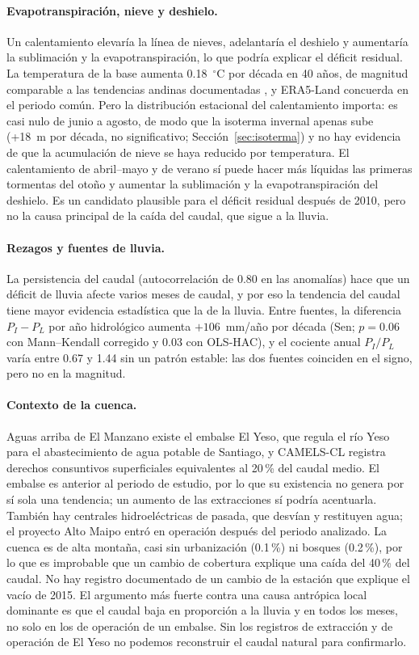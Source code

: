 \documentclass[11pt,a4paper]{article}
\newcommand{\PL}{P_L}
\newcommand{\PI}{P_I}
\begin{document}
\paragraph{Evapotranspiración, nieve y deshielo.} Un calentamiento elevaría la línea de nieves, adelantaría el deshielo y aumentaría la sublimación y la evapotranspiración, lo que podría explicar el déficit residual. La temperatura de la base aumenta 0.18~$^\circ$C por década en 40 años, de magnitud comparable a las tendencias andinas documentadas \citep{Falvey2009}, y ERA5-Land concuerda en el periodo común. Pero la distribución estacional del calentamiento importa: es casi nulo de junio a agosto, de modo que la isoterma invernal apenas sube (+18~m por década, no significativo; Sección~\ref{sec:isoterma}) y no hay evidencia de que la acumulación de nieve se haya reducido por temperatura. El calentamiento de abril--mayo y de verano sí puede hacer más líquidas las primeras tormentas del otoño y aumentar la sublimación y la evapotranspiración del deshielo. Es un candidato plausible para el déficit residual después de 2010, pero no la causa principal de la caída del caudal, que sigue a la lluvia.

\paragraph{Rezagos y fuentes de lluvia.} La persistencia del caudal (autocorrelación de 0.80 en las anomalías) hace que un déficit de lluvia afecte varios meses de caudal, y por eso la tendencia del caudal tiene mayor evidencia estadística que la de la lluvia. Entre fuentes, la diferencia $\PI-\PL$ por año hidrológico aumenta $+106$~mm/año por década (Sen; $p=0.06$ con Mann--Kendall corregido y 0.03 con OLS-HAC), y el cociente anual $\PI/\PL$ varía entre 0.67 y 1.44 sin un patrón estable: las dos fuentes coinciden en el signo, pero no en la magnitud.

\paragraph{Contexto de la cuenca.} Aguas arriba de El Manzano existe el embalse El Yeso, que regula el río Yeso para el abastecimiento de agua potable de Santiago, y CAMELS-CL registra derechos consuntivos superficiales equivalentes al 20\,\% del caudal medio. El embalse es anterior al periodo de estudio, por lo que su existencia no genera por sí sola una tendencia; un aumento de las extracciones sí podría acentuarla. También hay centrales hidroeléctricas de pasada, que desvían y restituyen agua; el proyecto Alto Maipo entró en operación después del periodo analizado. La cuenca es de alta montaña, casi sin urbanización (0.1\,\%) ni bosques (0.2\,\%), por lo que es improbable que un cambio de cobertura explique una caída del 40\,\% del caudal. No hay registro documentado de un cambio de la estación que explique el vacío de 2015. El argumento más fuerte contra una causa antrópica local dominante es que el caudal baja en proporción a la lluvia y en todos los meses, no solo en los de operación de un embalse. Sin los registros de extracción y de operación de El Yeso no podemos reconstruir el caudal natural para confirmarlo.
\end{document}
